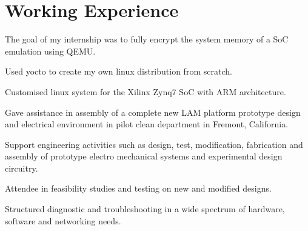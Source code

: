 \documentclass[]{resume}
\begin{document}
\begin{minipage}[t]{0.66\textwidth} 	
\section{Working Experience}
	 
	\vspace{\topsep} %
	\begin{tightemize}
		
		\item The goal of my internship was to fully encrypt the system memory of a SoC emulation using QEMU.
		\item Used yocto to create my own linux distribution from scratch.
		\item Customised linux system for the Xilinx Zynq7 SoC with ARM architecture. 

	\end{tightemize}
	\sectionsep

	 
	\begin{tightemize}
		
		\item Gave assistance in assembly of a complete new LAM platform prototype design and electrical environment in pilot clean department in Fremont, California.
		\item Support engineering activities such as design, test, modification, fabrication and assembly of prototype electro mechanical systems and experimental design circuitry. 	
		\item Attendee in feasibility studies and testing on new and modified designs.
		\item Structured diagnostic and troubleshooting in a wide spectrum of hardware, software and networking needs. 
		
	\end{tightemize}
	\sectionsep


\end{minipage}
\end{document}
